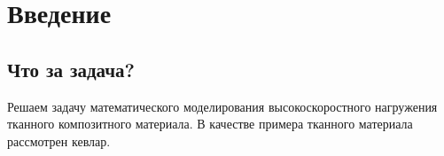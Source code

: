 \chapter{Введение}\label{ch:intro}

\section*{Что за задача?}

Решаем задачу математического моделирования высокоскоростного нагружения тканного композитного материала.
В качестве примера тканного материала рассмотрен кевлар.
